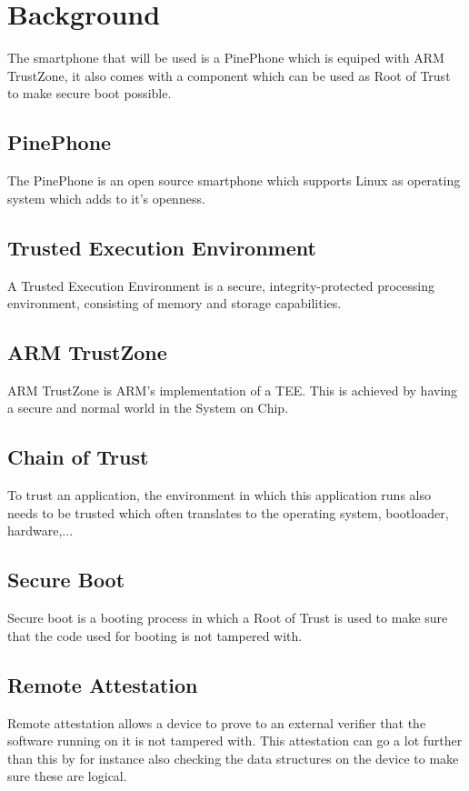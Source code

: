\documentclass{report}
\begin{document}
\chapter{Background}

The smartphone that will be used is a PinePhone which is equiped with ARM TrustZone, it also comes with a component which can be used as Root of Trust to make secure boot possible. 

\section{PinePhone}

The PinePhone is an open source smartphone which supports Linux as operating system which adds to it's openness.

\section{Trusted Execution Environment}

A Trusted Execution Environment is a secure, integrity-protected processing environment, consisting of memory and storage capabilities.

\section{ARM TrustZone}

ARM TrustZone is ARM's implementation of a TEE. This is achieved by having a secure and normal world in the System on Chip.

\section{Chain of Trust}

To trust an application, the environment in which this application runs also needs to be trusted which often translates to the operating system, bootloader, hardware,...

\section{Secure Boot}

Secure boot is a booting process in which a Root of Trust is used to make sure that the code used for booting is not tampered with.

\section{Remote Attestation}

Remote attestation allows a device to prove to an external verifier that the software running on it is not tampered with. This attestation can go a lot further than this by for instance also checking the data structures on the device to make sure these are logical.
\end{document}
